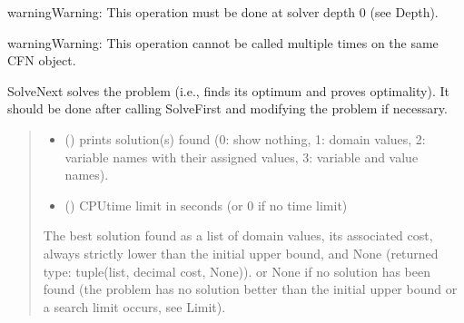 \documentclass[letterpaper,10pt,openany,oneside,english]{sphinxmanual}
\begin{document}
\begin{fulllineitems}
\begin{fulllineitems}
\begin{quote}
\begin{description}
\end{description}\end{quote}

\begin{sphinxadmonition}{warning}{Warning:}
\sphinxAtStartPar
This operation must be done at solver depth 0 (see Depth).
\end{sphinxadmonition}

\begin{sphinxadmonition}{warning}{Warning:}
\sphinxAtStartPar
This operation cannot be called multiple times on the same CFN object.
\end{sphinxadmonition}

\end{fulllineitems}


\begin{fulllineitems}
\label{\detokenize{ref/ref_python:pytoulbar2.CFN.SolveNext}}
\pysigstartsignatures
{}
\pysigstopsignatures
\sphinxAtStartPar
SolveNext solves the problem (i.e., finds its optimum and proves optimality).
It should be done after calling SolveFirst and modifying the problem if necessary.
\begin{quote}\begin{description}
\begin{itemize}
\item {} 
\sphinxAtStartPar
{} () \textendash{} prints solution(s) found (0: show nothing, 1: domain values, 2: variable names with their assigned values,
3: variable and value names).

\item {} 
\sphinxAtStartPar
{} () \textendash{} CPU\sphinxhyphen{}time limit in seconds (or 0 if no time limit)

\end{itemize}

\sphinxAtStartPar
The best solution found as a list of domain values, its associated cost, always strictly lower
than the initial upper bound, and None (returned type: tuple(list, decimal cost, None)).
or None if no solution has been found (the problem has no solution better than the initial upper bound or a search limit occurs, see Limit).


\end{description}
\end{quote}
\end{fulllineitems}
\end{fulllineitems}
\end{document}
